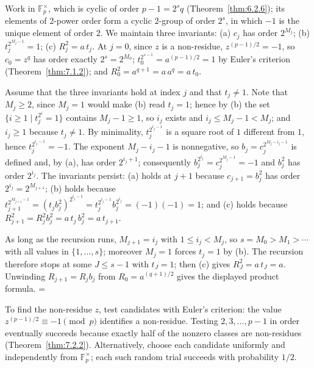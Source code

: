 \documentclass[11pt]{article}
\makeatletter
\theoremstyle{ntstyle}
\let\nt@closedisplay\]
\def\nt@guardedclose{\@ifnextchar\par{\nt@closeafterpar}{\@ifnextchar\end{\postdisplaypenalty\@M\nt@closedisplay}{\nt@closedisplay}}}
\def\nt@closeafterpar\par{\@ifnextchar\par{\nt@closeafterpar}{\@ifnextchar\end{\postdisplaypenalty\@M\nt@closedisplay\par}{\nt@closedisplay\par}}}
\renewenvironment{proof}[1][\proofname]{\par
  \pushQED{\qed}\normalfont\topsep\medskipamount\edef\nt@afterproof{\@endparpenalty=\the\@endparpenalty\relax}\@beginparpenalty\@M\@endparpenalty\@M\let\]\nt@guardedclose\trivlist\item[]\textit{#1\@addpunct{.}} \ignorespaces}{\ifvmode\addpenalty\@M\fi\popQED\nt@afterproof\endtrivlist\@endpefalse}
\makeatother
\begin{document}
\begin{proof} Work in $\mathbb{F}_p^{\times}$, which is cyclic of
	order $p-1=2^s q$ (Theorem~\ref{thm:6.2.6}); its elements of $2$-power order form a cyclic
	$2$-group of order $2^{s}$, in which $-1$ is the unique element of
	order $2$. We maintain three invariants: (a) $c_j$ has order $2^{M_j}$;
	(b) $t_j^{2^{M_j-1}} = 1$; (c) $R_j^{2} = a\,t_j$. At $j = 0$,
	since $z$ is a non-residue, $z^{(p-1)/2} = -1$, so $c_0 = z^{q}$ has
	order exactly $2^{s} = 2^{M_0}$; $t_0^{2^{s-1}} = a^{(p-1)/2} = 1$ by
	Euler's criterion (Theorem~\ref{thm:7.1.2}); and $R_0^{2} = a^{q+1} = a\,a^{q} = a\,t_0$.

	Assume that the three invariants hold at index $j$ and that $t_j \neq 1$. Note that $M_j
		\ge 2$, since $M_j = 1$ would make (b) read $t_j = 1$; hence by (b) the
	set $\{i \ge 1 \mid t_j^{2^{i}} = 1\}$ contains $M_j - 1 \ge 1$, so $i_j$
	exists and $i_j \le M_j - 1 < M_j$; and $i_j \ge 1$ because $t_j \neq
		1$. By minimality, $t_j^{2^{i_j-1}}$ is a square root of $1$ different
	from $1$, hence $t_j^{2^{i_j-1}} = -1$. The exponent $M_j - i_j - 1$ is
	nonnegative, so $b_j = c_j^{2^{M_j-i_j-1}}$ is defined and, by (a), has order
	$2^{i_j+1}$; consequently $b_j^{2^{i_j}} = c_j^{2^{M_j-1}} = -1$ and
	$b_j^{2}$ has order $2^{i_j}$. The invariants persist: (a) holds at $j+1$ because
	$c_{j+1} = b_j^{2}$ has order $2^{i_j} = 2^{M_{j+1}}$; (b) holds
	because $t_{j+1}^{2^{M_{j+1}-1}} = (t_jb_j^{2})^{2^{i_j-1}} =
		t_j^{2^{i_j-1}}b_j^{2^{i_j}} = (-1)(-1) = 1$; and (c) holds because
	$R_{j+1}^{2} = R_j^{2}b_j^{2} = a\,t_j\,b_j^{2} = a\,t_{j+1}$.

	As long as the recursion runs, $M_{j+1} = i_j$ with $1 \le i_j < M_j$,
	so $s = M_0 > M_1 > \cdots$ with all values in $\{1, \ldots, s\}$;
	moreover $M_j = 1$ forces $t_j = 1$ by (b). The recursion therefore
	stops at some $J \le s-1$ with $t_J = 1$; then (c) gives $R_J^{2} = a\,t_J = a$. Unwinding $R_{j+1} = R_jb_j$
	from $R_0 = a^{(q+1)/2}$ gives the displayed product formula.
\end{proof}

To find the non-residue $z$, test candidates with Euler's criterion:
the value $z^{(p-1)/2}\equiv-1\pmod{p}$ identifies a non-residue.
Testing $2,3,\ldots,p-1$ in order eventually succeeds because exactly
half of the nonzero classes are non-residues (Theorem~\ref{thm:7.2.2}).
Alternatively, choose each candidate uniformly and independently from
$\mathbb{F}_p^{\times}$; each such random trial succeeds with probability
$1/2$.
\end{document}
